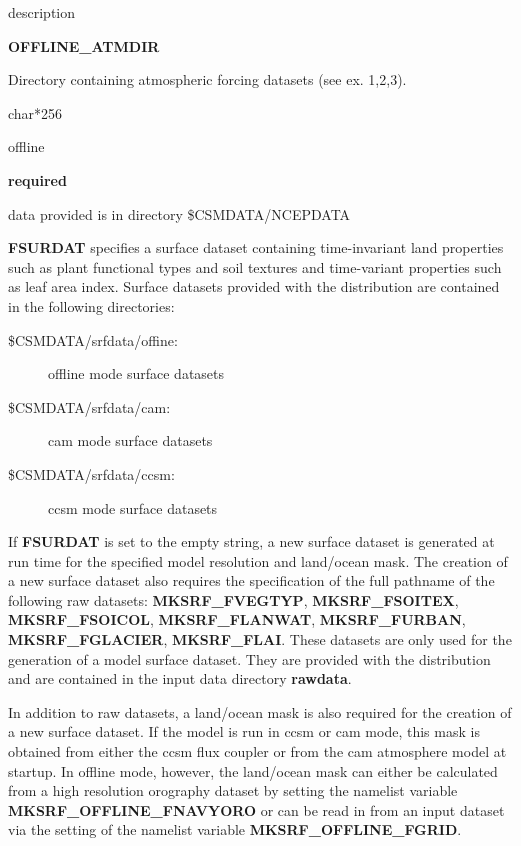 \begin{Ventry}{description}
 \item[{\bf name}] {\bf OFFLINE\_ATMDIR}  
 \item[description] Directory containing atmospheric forcing datasets (see ex. 1,2,3). 
 \item[type] char*256   
 \item[mode] offline   
 \item[default] {\bf required}  
 \item[notes] data provided is in directory \$CSMDATA/NCEPDATA  
\end{Ventry}
\bigskip

{\bf FSURDAT} specifies a surface dataset containing time-invariant
land properties such as plant functional types and soil textures and
time-variant properties such as leaf area index. Surface datasets
provided with the distribution are contained in the following
directories:

\begin{description}
\item [\$CSMDATA/srfdata/offine: ] offline mode surface datasets
\item [\$CSMDATA/srfdata/cam: ]  cam mode surface datasets
\item [\$CSMDATA/srfdata/ccsm: ]  ccsm mode surface datasets
\end{description}

If {\bf FSURDAT} is set to the empty string, a new surface dataset is
generated at run time for the specified model resolution and
land/ocean mask. The creation of a new surface dataset also requires
the specification of the full pathname of the following raw datasets:
{\bf MKSRF\_FVEGTYP}, {\bf MKSRF\_FSOITEX}, {\bf MKSRF\_FSOICOL}, {\bf
MKSRF\_FLANWAT}, {\bf MKSRF\_FURBAN}, {\bf MKSRF\_FGLACIER}, {\bf
MKSRF\_FLAI}.  These datasets are only used for the generation of a
model surface dataset. They are provided with the distribution and are
contained in the input data directory {\bf rawdata}.

In addition to raw datasets, a land/ocean mask is also required for
the creation of a new surface dataset. If the model is run in ccsm or
cam mode, this mask is obtained from either the ccsm flux coupler or
from the cam atmosphere model at startup.  In offline mode, however,
the land/ocean mask can either be calculated from a high resolution
orography dataset by setting the namelist variable {\bf
MKSRF\_OFFLINE\_FNAVYORO} or can be read in from an input dataset via
the setting of the namelist variable {\bf MKSRF\_OFFLINE\_FGRID}.

